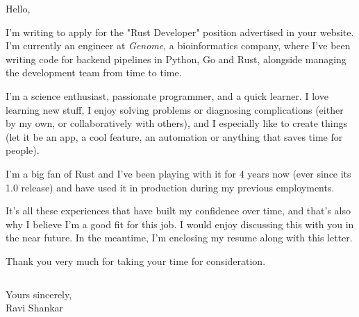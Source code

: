 \documentclass[11pt,a4paper,sans]{moderncv}        %
\begin{document}

\clearpage


\date{August 01, 2019}
\opening{Hello,}

\makelettertitle

I'm writing to apply for the "Rust Developer" position advertised in your website. I'm currently an engineer at \textit{Genome}, a bioinformatics company, where I've been writing code for backend pipelines in Python, Go and Rust, alongside managing the development team from time to time.

I'm a science enthusiast, passionate programmer, and a quick learner. I love learning new stuff, I enjoy solving problems or diagnosing complications (either by my own, or collaboratively with others), and I especially like to create things (let it be an app, a cool feature, an automation or anything that saves time for people).

I'm a big fan of Rust and I've been playing with it for 4 years now (ever since its 1.0 release) and have used it in production during my previous employments.

It's all these experiences that have built my confidence over time, and that's also why I believe I'm a good fit for this job. I would enjoy discussing this with you in the near future. In the meantime, I'm enclosing my resume along with this letter.

Thank you very much for taking your time for consideration.

$\ $

Yours sincerely,
\\
Ravi Shankar

\end{document}
